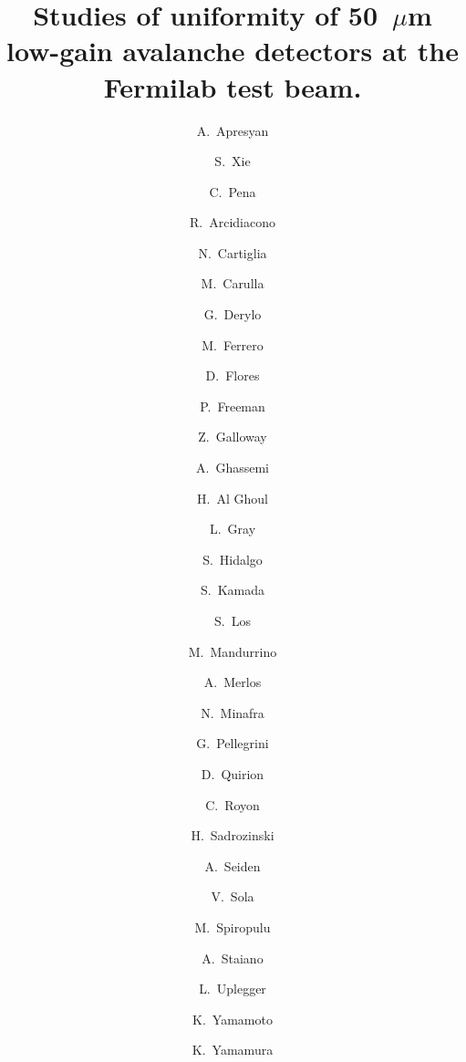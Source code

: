 \documentclass[preprint,1p]{elsarticle}
\begin{document}
\linenumbers

\begin{frontmatter}



\title{Studies of uniformity of 50~$\mu$m low-gain avalanche detectors
at the Fermilab test beam.}


\author[1]{A.~Apresyan}
\author[2]{S.~Xie}
\author[2]{C.~Pena}
\author[5,7]{R.~Arcidiacono}
\author[5]{N.~Cartiglia}
\author[8]{M.~Carulla}
\author[1]{G.~Derylo}
\author[5]{M.~Ferrero}
\author[8]{D.~Flores}
\author[4]{P.~Freeman}
\author[4]{Z.~Galloway}
\author[9]{A.~Ghassemi}
\author[3]{H.~Al Ghoul}
\author[1]{L.~Gray}
\author[8]{S.~Hidalgo}
\author[9]{S.~Kamada}
\author[1]{S.~Los}
\author[5]{M.~Mandurrino}
\author[8]{A.~Merlos}
\author[3]{N.~Minafra}
\author[8]{G.~Pellegrini}
\author[8]{D.~Quirion}
\author[3]{C.~Royon}
\author[4]{H.~Sadrozinski}
\author[4]{A.~Seiden}
\author[5]{V.~Sola}
\author[2]{M.~Spiropulu}
\author[5]{A.~Staiano}
\author[1]{L.~Uplegger}
\author[9]{K.~Yamamoto}
\author[9]{K.~Yamamura}

\address[1]{Fermi National Accelerator Laboratory, Batavia, IL, USA}
\address[2]{California Institute of Technology, Pasadena, CA, USA}
\address[3]{University of Kansas, KS, USA}
\address[4]{SCIPP, University of California Santa Cruz, CA, USA}
\address[5]{INFN, Torino, Italy}
\address[6]{Universit\`a di Torino, Torino, Italy}
\address[7]{Universit\`a del Piemonte Orientale, Italy}
\address[8]{Centro Nacional de Microelectr\'{o}nica (IMB-CNM-CSIC), Barcelona, Spain}
\address[9]{Hamamatsu Photonics (HPK), Hamamatsu, Japan}


\end{frontmatter}
\end{document}
